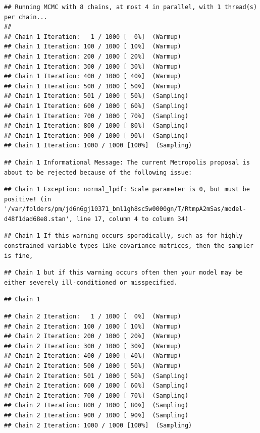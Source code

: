 \documentclass[
]{book}
\begin{document}
\begin{verbatim}
## Running MCMC with 8 chains, at most 4 in parallel, with 1 thread(s) per chain...
## 
## Chain 1 Iteration:   1 / 1000 [  0%]  (Warmup) 
## Chain 1 Iteration: 100 / 1000 [ 10%]  (Warmup) 
## Chain 1 Iteration: 200 / 1000 [ 20%]  (Warmup) 
## Chain 1 Iteration: 300 / 1000 [ 30%]  (Warmup) 
## Chain 1 Iteration: 400 / 1000 [ 40%]  (Warmup) 
## Chain 1 Iteration: 500 / 1000 [ 50%]  (Warmup) 
## Chain 1 Iteration: 501 / 1000 [ 50%]  (Sampling) 
## Chain 1 Iteration: 600 / 1000 [ 60%]  (Sampling) 
## Chain 1 Iteration: 700 / 1000 [ 70%]  (Sampling) 
## Chain 1 Iteration: 800 / 1000 [ 80%]  (Sampling) 
## Chain 1 Iteration: 900 / 1000 [ 90%]  (Sampling) 
## Chain 1 Iteration: 1000 / 1000 [100%]  (Sampling)
\end{verbatim}

\begin{verbatim}
## Chain 1 Informational Message: The current Metropolis proposal is about to be rejected because of the following issue:
\end{verbatim}

\begin{verbatim}
## Chain 1 Exception: normal_lpdf: Scale parameter is 0, but must be positive! (in '/var/folders/pm/jd6n6gj10371_bml1gh8sc5w0000gn/T/RtmpA2mSas/model-d48f1dad68e8.stan', line 17, column 4 to column 34)
\end{verbatim}

\begin{verbatim}
## Chain 1 If this warning occurs sporadically, such as for highly constrained variable types like covariance matrices, then the sampler is fine,
\end{verbatim}

\begin{verbatim}
## Chain 1 but if this warning occurs often then your model may be either severely ill-conditioned or misspecified.
\end{verbatim}

\begin{verbatim}
## Chain 1
\end{verbatim}

\begin{verbatim}
## Chain 2 Iteration:   1 / 1000 [  0%]  (Warmup) 
## Chain 2 Iteration: 100 / 1000 [ 10%]  (Warmup) 
## Chain 2 Iteration: 200 / 1000 [ 20%]  (Warmup) 
## Chain 2 Iteration: 300 / 1000 [ 30%]  (Warmup) 
## Chain 2 Iteration: 400 / 1000 [ 40%]  (Warmup) 
## Chain 2 Iteration: 500 / 1000 [ 50%]  (Warmup) 
## Chain 2 Iteration: 501 / 1000 [ 50%]  (Sampling) 
## Chain 2 Iteration: 600 / 1000 [ 60%]  (Sampling) 
## Chain 2 Iteration: 700 / 1000 [ 70%]  (Sampling) 
## Chain 2 Iteration: 800 / 1000 [ 80%]  (Sampling) 
## Chain 2 Iteration: 900 / 1000 [ 90%]  (Sampling) 
## Chain 2 Iteration: 1000 / 1000 [100%]  (Sampling)
\end{verbatim}
\end{document}
